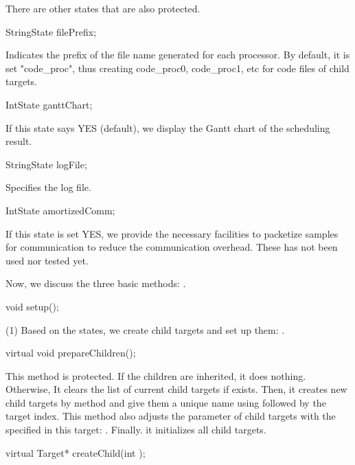 There are other states that are also protected.

\begin{example}
StringState filePrefix;
\end{example}

Indicates the prefix of the file name generated for each processor.
By default, it is set "code_proc", thus creating code_proc0, code_proc1, etc
for code files of child targets.

\begin{example}
IntState ganttChart;
\end{example}

If this state says YES (default), we display the Gantt chart of the 
scheduling result. 

\begin{example}
StringState logFile;
\end{example}

Specifies the log file.

\begin{example}
IntState amortizedComm;
\end{example}

If this state is set YES, we provide the necessary facilities to packetize
samples for communication to reduce the communication overhead. These
has not been used nor tested yet.

Now, we discuss the three basic methods: .

\begin{example}
void setup();
\end{example}

(1) Based on the states, we create child targets and set up them:
.

\begin{example}
virtual void prepareChildren();
\end{example}

This method is protected. If the children are inherited, it does nothing.
Otherwise, It clears the list of current child targets if exists. Then,
it creates new child targets by  method and give them
a unique name using  followed by the target index.
This method also adjusts the  parameter of child targets
with the  specified in this target: .
Finally. it initializes all child targets.

\begin{example}
virtual Target* createChild(int );
\end{example}

